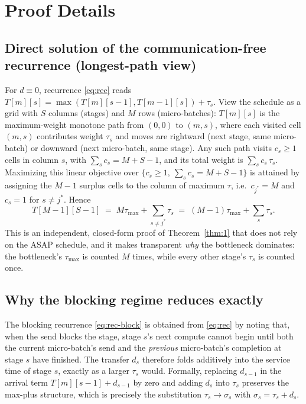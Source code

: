 \documentclass[11pt]{article}
\begin{document}
\appendix

\section{Proof Details}\label{app:proofs}

\subsection{Direct solution of the communication-free recurrence (longest-path view)}\label{app:direct}

For $d\equiv0$, recurrence \eqref{eq:rec} reads $T[m][s]=\max(T[m][s-1],T[m-1][s])+\tau_s$. View the schedule as a grid with $S$ columns (stages) and $M$ rows (micro-batches): $T[m][s]$ is the maximum-weight monotone path from $(0,0)$ to $(m,s)$, where each visited cell $(m,s)$ contributes weight $\tau_s$ and moves are rightward (next stage, same micro-batch) or downward (next micro-batch, same stage). Any such path visits $c_s\ge1$ cells in column $s$, with $\sum_s c_s = M+S-1$, and its total weight is $\sum_s c_s\,\tau_s$. Maximizing this linear objective over $\{c_s\ge1,\ \sum_s c_s=M+S-1\}$ is attained by assigning the $M-1$ surplus cells to the column of maximum $\tau$, i.e.\ $c_{j^*}=M$ and $c_s=1$ for $s\ne j^*$. Hence
\[
T[M-1][S-1] \;=\; M\tau_{\max} + \sum_{s\ne j^*}\tau_s \;=\; (M-1)\tau_{\max}+\sum_s\tau_s .
\]
This is an independent, closed-form proof of Theorem~\ref{thm:1} that does not rely on the ASAP schedule, and it makes transparent \emph{why} the bottleneck dominates: the bottleneck's $\tau_{\max}$ is counted $M$ times, while every other stage's $\tau_s$ is counted once.

\subsection{Why the blocking regime reduces exactly}

The blocking recurrence \eqref{eq:rec-block} is obtained from \eqref{eq:rec} by noting that, when the send blocks the stage, stage $s$'s next compute cannot begin until both the current micro-batch's send and the \emph{previous} micro-batch's completion at stage $s$ have finished. The transfer $d_s$ therefore folds additively into the service time of stage $s$, exactly as a larger $\tau_s$ would. Formally, replacing $d_{s-1}$ in the arrival term $T[m][s-1]+d_{s-1}$ by zero and adding $d_s$ into $\tau_s$ preserves the max-plus structure, which is precisely the substitution $\tau_s\to\sigma_s$ with $\sigma_s=\tau_s+d_s$.
\end{document}
